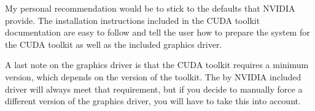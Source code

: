 My personal recommendation would be to stick to the defaults that NVIDIA provide. The installation instructions included in the CUDA toolkit documentation are easy to follow and tell the user how to prepare the system for the CUDA toolkit as well as the included graphics driver.\vspace{5mm}

A last note on the graphics driver is that the CUDA toolkit requires a minimum version, which depends on the version of the toolkit. The by NVIDIA included driver will always meet that requirement, but if you decide to manually force a different version of the graphics driver, you will have to take this into account.

